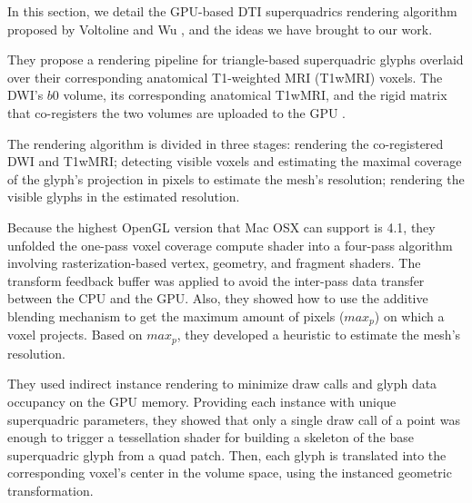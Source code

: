 \documentclass[twoside,twocolumn,10pt]{article}
\begin{document}
In this section, we detail the GPU-based DTI superquadrics rendering algorithm proposed by Voltoline and Wu \cite{voltoline2021}, and the ideas we have brought to our work.

They propose a rendering pipeline for triangle-based superquadric glyphs overlaid over their corresponding anatomical T1-weighted MRI (T1wMRI) voxels. The DWI's $b0$ volume, its corresponding anatomical T1wMRI, and the rigid matrix that co-registers the two volumes are uploaded to the GPU \cite{ting2014}.



The rendering algorithm is divided in three stages: rendering the co-registered DWI and T1wMRI; detecting visible voxels and estimating the maximal coverage of the glyph's projection in pixels to estimate the mesh's resolution; rendering the visible glyphs in the estimated resolution. %

Because the highest OpenGL version that Mac OSX can support is 4.1, they unfolded the one-pass voxel coverage compute shader into a four-pass algorithm involving rasterization-based vertex, geometry, and fragment shaders. The transform feedback buffer was applied to avoid the inter-pass data transfer between the CPU and the GPU. Also, they showed how to use the additive blending mechanism to get the maximum amount of pixels ($max_p$) on which a voxel projects.  Based on $max_p$, they developed a heuristic to estimate the mesh's resolution.


They used indirect instance rendering to minimize draw calls and glyph data occupancy on the GPU memory. Providing each instance with unique superquadric parameters, they showed that only a single draw call of a point was enough to trigger a tessellation shader for building a skeleton of the base superquadric glyph from a quad patch. Then, each glyph is translated into the corresponding voxel's center in the volume space, using the instanced geometric transformation.
\end{document}
